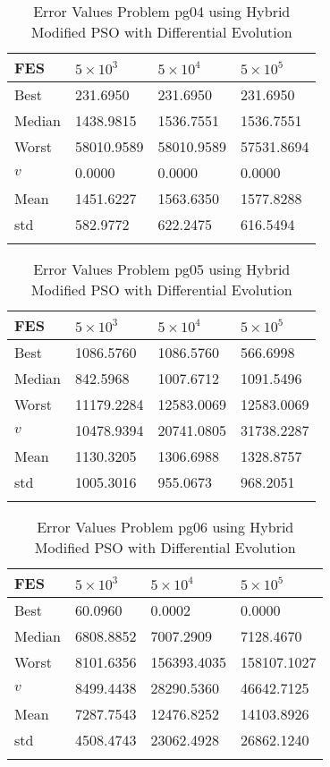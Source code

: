 \documentclass[10pt, a4paper]{book}
\begin{document}
\begin{center}
\begin{longtable}{l l l l}
FES & $5 \times 10^{3}$ & $5 \times 10^{4}$ & $5 \times 10^{5}$ \\
\hline
Best & 231.6950 & 231.6950 & 231.6950 \\
Median & 1438.9815 & 1536.7551 & 1536.7551 \\
Worst & 58010.9589 & 58010.9589 & 57531.8694 \\
$v$ & 0.0000 & 0.0000 & 0.0000 \\
Mean & 1451.6227 & 1563.6350 & 1577.8288 \\
std & 582.9772 & 622.2475 & 616.5494 \\
\caption{ Error Values Problem pg04 using Hybrid Modified PSO with Differential Evolution }
\end{longtable}
\end{center}

\begin{center}
\begin{longtable}{l l l l}
FES & $5 \times 10^{3}$ & $5 \times 10^{4}$ & $5 \times 10^{5}$ \\
\hline
Best & 1086.5760 & 1086.5760 & 566.6998 \\
Median & 842.5968 & 1007.6712 & 1091.5496 \\
Worst & 11179.2284 & 12583.0069 & 12583.0069 \\
$v$ & 10478.9394 & 20741.0805 & 31738.2287 \\
Mean & 1130.3205 & 1306.6988 & 1328.8757 \\
std & 1005.3016 & 955.0673 & 968.2051 \\
\caption{ Error Values Problem pg05 using Hybrid Modified PSO with Differential Evolution }
\end{longtable}
\end{center}

\begin{center}
\begin{longtable}{l l l l}
FES & $5 \times 10^{3}$ & $5 \times 10^{4}$ & $5 \times 10^{5}$ \\
\hline
Best & 60.0960 & 0.0002 & 0.0000 \\
Median & 6808.8852 & 7007.2909 & 7128.4670 \\
Worst & 8101.6356 & 156393.4035 & 158107.1027 \\
$v$ & 8499.4438 & 28290.5360 & 46642.7125 \\
Mean & 7287.7543 & 12476.8252 & 14103.8926 \\
std & 4508.4743 & 23062.4928 & 26862.1240 \\
\caption{ Error Values Problem pg06 using Hybrid Modified PSO with Differential Evolution }
\end{longtable}
\end{center}
\end{document}
